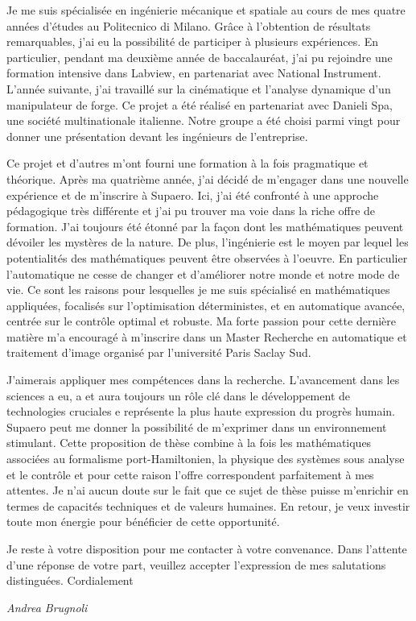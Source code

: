 \documentclass[11pt]{letter}
\begin{document}
Je me suis spécialisée en ingénierie mécanique et spatiale au cours de mes quatre années d'études au Politecnico di Milano. Grâce à l'obtention de résultats remarquables, j'ai eu la possibilité de participer à plusieurs expériences. En particulier, pendant ma deuxième année de baccalauréat, j'ai pu rejoindre une formation intensive dans Labview, en partenariat avec National Instrument. L'année suivante, j'ai travaillé sur la cinématique et l'analyse dynamique d'un manipulateur de forge. Ce projet a été réalisé en partenariat avec Danieli Spa, une société multinationale italienne. Notre groupe a été choisi parmi vingt pour donner une présentation devant les ingénieurs de l'entreprise.
\begin{comment}
J'ai spécialement apprécié de travailler sur un projet de transfert interplanétaire. Dans des missions spatiales complexes différentes disciplines doivent être intégrées et c'est la raison pour la quelle j'ai travaillé passionnément au projet. Plus tard, j'ai eu l'occasion de travailler sur la dynamique multi-corps dans l'environnement Simulink pour étudier les flexibilités des appendices au cours de manoeuvres de satellites.
\end{comment}
 Ce projet et d'autres m'ont fourni une formation à la fois pragmatique et théorique. Après ma quatrième année, j'ai décidé de m'engager dans une nouvelle expérience et de m'inscrire à Supaero. Ici, j'ai été confronté à une approche pédagogique très différente et j'ai pu trouver ma voie dans la riche offre de formation. J'ai toujours été étonné par la façon dont les mathématiques peuvent dévoiler les mystères de la nature. De plus, l'ingénierie est le moyen par lequel les potentialités des mathématiques peuvent être observées à l'oeuvre. En particulier l'automatique ne cesse de changer et d'améliorer notre monde et notre mode de vie. Ce sont les raisons pour lesquelles je me suis spécialisé en mathématiques appliquées, focalisés sur l'optimisation déterministes,  et en automatique avancée, centrée sur le contrôle optimal et robuste. Ma forte passion pour cette dernière matière m'a encouragé à m'inscrire dans un Master Recherche en automatique et traitement d'image organisé par l'université Paris Saclay Sud. 

J'aimerais appliquer mes compétences dans la recherche. L'avancement dans les sciences a eu, a et aura toujours un rôle clé dans le développement de technologies cruciales e représente la plus haute expression du progrès humain.   Supaero peut me donner la possibilité de m'exprimer dans un environnement stimulant. Cette proposition de thèse combine à la fois les mathématiques associées au formalisme port-Hamiltonien, la physique des systèmes sous analyse et le contrôle  et pour cette raison l'offre correspondent parfaitement à mes attentes. Je n'ai aucun doute sur le fait que ce sujet de thèse puisse m'enrichir en termes de capacités techniques et de valeurs humaines. En retour, je veux investir toute mon énergie pour bénéficier de cette opportunité.

Je reste à votre disposition pour me contacter à votre convenance. Dans l'attente d'une réponse de votre part, veuillez accepter l'expression de mes salutations distinguées. Cordialement


 \begin{center}
 \large\textit{Andrea Brugnoli}
 \end{center}
 
\end{document}
